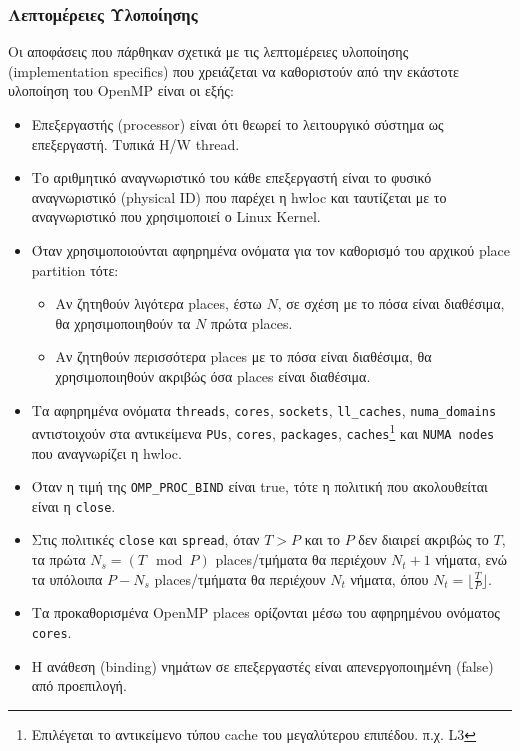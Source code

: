 \subsubsection{Λεπτομέρειες Υλοποίησης}
Οι αποφάσεις που πάρθηκαν σχετικά με τις λεπτομέρειες υλοποίησης (implementation specifics) που χρειάζεται να καθοριστούν από την εκάστοτε υλοποίηση του OpenMP είναι οι εξής:
\begin{itemize}
	\item Επεξεργαστής (processor) είναι ότι θεωρεί το λειτουργικό σύστημα ως επεξεργαστή. Τυπικά H/W thread.
	\item Το αριθμητικό αναγνωριστικό του κάθε επεξεργαστή είναι το φυσικό αναγνωριστικό (physical ID) που παρέχει η hwloc και ταυτίζεται με το αναγνωριστικό που χρησιμοποιεί ο Linux Kernel.
	\item Όταν χρησιμοποιούνται αφηρημένα ονόματα για τον καθορισμό του αρχικού place partition τότε:
		\begin{itemize}
			\item Αν ζητηθούν λιγότερα places, έστω $N$, σε σχέση με το πόσα είναι διαθέσιμα, θα χρησιμοποιηθούν τα $N$ πρώτα places.
			\item Αν ζητηθούν περισσότερα places με το πόσα είναι διαθέσιμα, θα χρησιμοποιηθούν ακριβώς όσα places είναι διαθέσιμα.
		\end{itemize}
	\item Τα αφηρημένα ονόματα \texttt{threads}, \texttt{cores}, \texttt{sockets}, \texttt{ll\_caches}, \texttt{numa\_domains} αντιστοιχούν στα αντικείμενα \texttt{PUs}, \texttt{cores}, \texttt{packages}, \texttt{caches}\footnote{Επιλέγεται το αντικείμενο τύπου cache του μεγαλύτερου επιπέδου. π.χ. L3} και \texttt{NUMA nodes} που αναγνωρίζει η hwloc.
	\item Όταν η τιμή της \texttt{OMP\_PROC\_BIND} είναι true, τότε η πολιτική που ακολουθείται είναι η \texttt{close}.
	\item Στις πολιτικές \texttt{close} και \texttt{spread}, όταν $T > P$ και το $P$ δεν διαιρεί ακριβώς το $T$, τα πρώτα $N_s = (T \mod P)$ places/τμήματα θα περιέχουν $N_t + 1$ νήματα, ενώ τα υπόλοιπα $P - N_s$ places/τμήματα θα περιέχουν $N_t$ νήματα, όπου $N_t = \lfloor \frac{T}{P} \rfloor$.
	\item Τα προκαθορισμένα OpenMP places ορίζονται μέσω του αφηρημένου ονόματος \texttt{cores}.
	\item Η ανάθεση (binding) νημάτων σε επεξεργαστές είναι απενεργοποιημένη (false) από προεπιλογή.\end{itemize}
